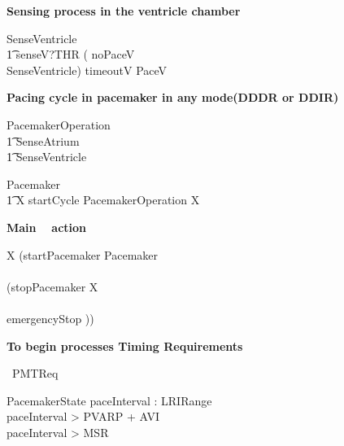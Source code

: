 \textbf {Sensing process in the ventricle chamber}



\begin{circusaction}
SenseVentricle \circdef \\
\t1 senseV?THR \then 
   ( noPaceV \then \Skip \\
   \extchoice SenseVentricle) \extchoice timeoutV \then PaceV
\end{circusaction}




\textbf {Pacing cycle in pacemaker in any mode(DDDR or DDIR)}
\begin{circusaction}
PacemakerOperation \circdef\\
  \t1 SenseAtrium \circseq \\
  \t1 SenseVentricle
\end{circusaction}

\begin{circusaction}
Pacemaker \circdef \\
\t1 \circmu X \circspot startCycle \then PacemakerOperation \circseq X 
\end{circusaction}


\textbf{ Main \Circus~ action }\\

\begin{circusaction}
  \circspot \circmu X \circspot (startPacemaker \then Pacemaker \\ 
   \circinterrupt \\
   (stopPacemaker \then X \\ 
  \extchoice \\
  emergencyStop \then \Stop)) 
\end{circusaction}

\begin{circus}
  \circend
\end{circus}





\hline
\textbf{To begin \Circus processes Timing Requirements}
\hline

\begin{circus}
	\circprocess\ PMTReq \circdef \circbegin
\end{circus}

\begin{schema}{PacemakerState}
  paceInterval : LRIRange  \\
  \where
  paceInterval > PVARP + AVI \\
  paceInterval > MSR \\
\end{schema}


